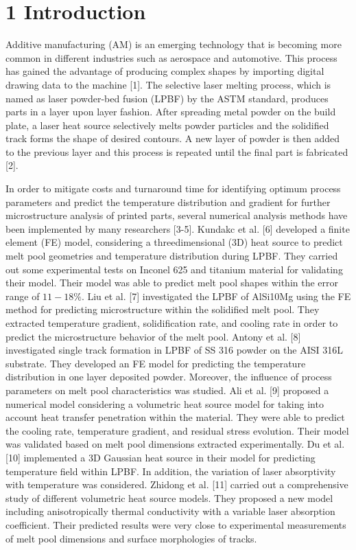 \documentclass[10pt]{article}
\begin{document}
\section*{1 Introduction}
Additive manufacturing (AM) is an emerging technology that is becoming more common in different industries such as aerospace and automotive. This process has gained the advantage of producing complex shapes by importing digital drawing data to the machine [1]. The selective laser melting process, which is named as laser powder-bed fusion (LPBF) by the ASTM standard, produces parts in a layer upon layer fashion. After spreading metal powder on the build plate, a laser heat source selectively melts powder particles and the solidified track forms the shape of desired contours. A new layer of powder is then added to the previous layer and this process is repeated until the final part is fabricated [2].

In order to mitigate costs and turnaround time for identifying optimum process parameters and predict the temperature distribution and gradient for further microstructure analysis of printed parts, several numerical analysis methods have been implemented by many researchers [3-5]. Kundakc et al. [6] developed a finite element (FE) model, considering a threedimensional (3D) heat source to predict melt pool geometries and temperature distribution during LPBF. They carried out some experimental tests on Inconel 625 and titanium material for validating their model. Their model was able to predict melt pool shapes within the error range of $11-18 \%$. Liu et al. [7] investigated the LPBF of AlSi10Mg using the FE method for predicting microstructure within the solidified melt pool. They extracted temperature gradient, solidification rate, and cooling rate in order to predict the microstructure behavior of the melt pool. Antony et al. [8] investigated single track formation in LPBF of SS 316 powder on the AISI 316L substrate. They developed an FE model for predicting the temperature distribution in one layer deposited powder. Moreover, the influence of process parameters on melt pool characteristics was studied. Ali et al. [9] proposed a numerical model considering a volumetric heat source model for taking into account heat transfer penetration within the material. They were able to predict the cooling rate, temperature gradient, and residual stress evolution. Their model was validated based on melt pool dimensions extracted experimentally. $\mathrm{Du}$ et al. [10] implemented a 3D Gaussian heat source in their model for predicting temperature field within LPBF. In addition, the variation of laser absorptivity with temperature was considered. Zhidong et al. [11] carried out a comprehensive study of different volumetric heat source models. They proposed a new model including anisotropically thermal conductivity with a variable laser absorption coefficient. Their predicted results were very close to experimental measurements of melt pool dimensions and surface morphologies of tracks.
\end{document}
